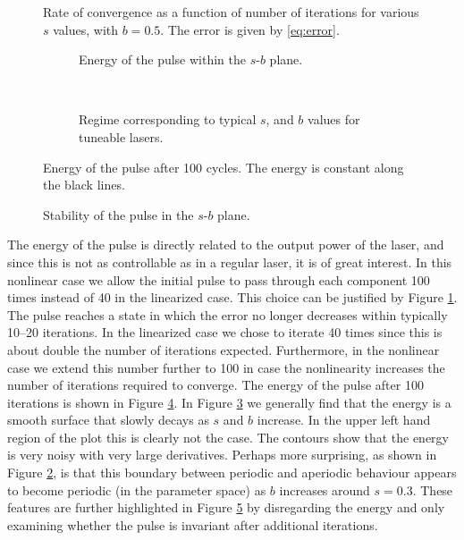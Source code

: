 \begin{figure}[tbp]
\centering

\caption{Rate of convergence as a function of number of iterations for various $s$ values, with $b = 0.5$. The error is given by \eqref{eq:error}.}
\label{fig:roc}
\end{figure}

\begin{figure}[p]
\centering
\begin{subfigure}{\textwidth}

\caption{Energy of the pulse within the $s$-$b$ plane.}
\label{fig:energybig}
\end{subfigure} \\
\begin{subfigure}{\textwidth}

\caption{Regime corresponding to typical $s$, and $b$ values for tuneable lasers.}
\label{fig:energyzoom}
\end{subfigure}
\caption[Energy of the pulse.]{Energy of the pulse after 100 cycles. The energy is constant along the black lines.}
\label{fig:energy}
\end{figure}

\begin{figure}[tbp]

\caption{Stability of the pulse in the $s$-$b$ plane.}
\label{fig:cartoon}
\end{figure}

The energy of the pulse is directly related to the output power of the laser, and since this is not as controllable as in a regular laser, it is of great interest. In this nonlinear case we allow the initial pulse to pass through each component 100 times instead of 40 in the linearized case. This choice can be justified by Figure \ref{fig:roc}. The pulse reaches a state in which the error no longer decreases within typically 10--20 iterations. In the linearized case we chose to iterate 40 times since this is about double the number of iterations expected. Furthermore, in the nonlinear case we extend this number further to 100 in case the nonlinearity increases the number of iterations required to converge. The energy of the pulse after 100 iterations is shown in Figure \ref{fig:energy}. In Figure \ref{fig:energyzoom} we generally find that the energy is a smooth surface that slowly decays as $s$ and $b$ increase. In the upper left hand region of the plot this is clearly not the case. The contours show that the energy is very noisy with very large derivatives. Perhaps more surprising, as shown in Figure \ref{fig:energybig}, is that this boundary between periodic and aperiodic behaviour appears to become periodic (in the parameter space) as $b$ increases around $s = 0.3$. These features are further highlighted in Figure \ref{fig:cartoon} by disregarding the energy and only examining whether the pulse is invariant after additional iterations.

